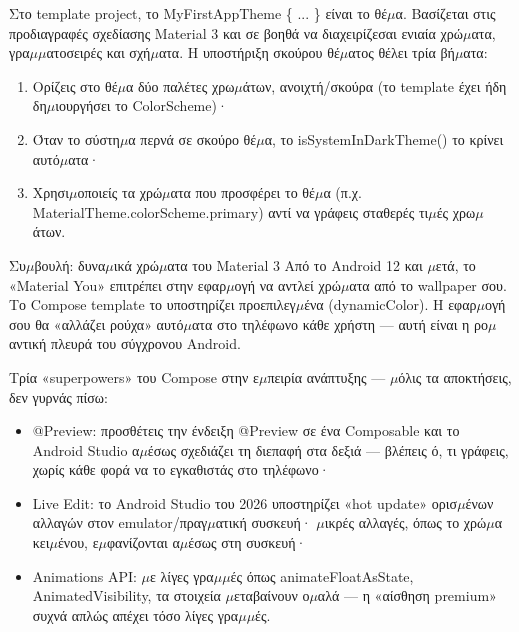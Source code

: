 
Στο template project, το MyFirstAppTheme \{ ... \} είναι το θέ$\mu$α. Βασίζεται στις προδιαγραφές σχεδίασης Material 3 και σε βοηθά να διαχειρίζεσαι ενιαία χρώ$\mu$ατα, γρα$\mu$$\mu$ατοσειρές και σχή$\mu$ατα. Η υποστήριξη σκούρου θέ$\mu$ατος θέλει τρία βή$\mu$ατα:

\begin{enumerate}
  \item Ορίζεις στο θέ$\mu$α δύο παλέτες χρω$\mu$άτων, ανοιχτή/σκούρα (το template έχει ήδη δη$\mu$ιουργήσει το ColorScheme)·
  \item Όταν το σύστη$\mu$α περνά σε σκούρο θέ$\mu$α, το isSystemInDarkTheme() το κρίνει αυτό$\mu$ατα·
  \item Χρησι$\mu$οποιείς τα χρώ$\mu$ατα που προσφέρει το θέ$\mu$α (π.χ. MaterialTheme.colorScheme.primary) αντί να γράφεις σταθερές τι$\mu$ές χρω$\mu$άτων.
\end{enumerate}

\begin{tcbinfo}{Συ$\mu$βουλή: δυνα$\mu$ικά χρώ$\mu$ατα του Material 3}
Από το Android 12 και $\mu$ετά, το «Material You» επιτρέπει στην εφαρ$\mu$ογή να αντλεί χρώ$\mu$ατα από το wallpaper σου. Το Compose template το υποστηρίζει προεπιλεγ$\mu$ένα (dynamicColor). Η εφαρ$\mu$ογή σου θα «αλλάζει ρούχα» αυτό$\mu$ατα στο τηλέφωνο κάθε χρήστη — αυτή είναι η ρο$\mu$αντική πλευρά του σύγχρονου Android.

\end{tcbinfo}


Τρία «superpowers» του Compose στην ε$\mu$πειρία ανάπτυξης — $\mu$όλις τα αποκτήσεις, δεν γυρνάς πίσω:

\begin{itemize}
  \item @Preview: προσθέτεις την ένδειξη @Preview σε ένα Composable και το Android Studio α$\mu$έσως σχεδιάζει τη διεπαφή στα δεξιά — βλέπεις ό, τι γράφεις, χωρίς κάθε φορά να το εγκαθιστάς στο τηλέφωνο·
  \item Live Edit: το Android Studio του 2026 υποστηρίζει «hot update» ορισ$\mu$ένων αλλαγών στον emulator/πραγ$\mu$ατική συσκευή· $\mu$ικρές αλλαγές, όπως το χρώ$\mu$α κει$\mu$ένου, ε$\mu$φανίζονται α$\mu$έσως στη συσκευή·
  \item Animations API: $\mu$ε λίγες γρα$\mu$$\mu$ές όπως animateFloatAsState, AnimatedVisibility, τα στοιχεία $\mu$εταβαίνουν ο$\mu$αλά — η «αίσθηση premium» συχνά απλώς απέχει τόσο λίγες γρα$\mu$$\mu$ές.
\end{itemize}

